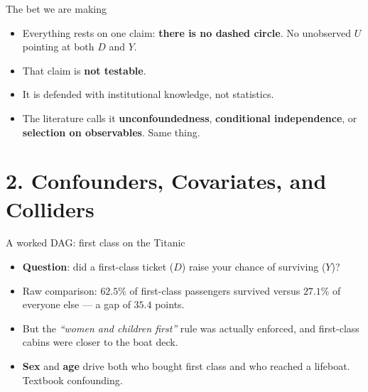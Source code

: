 \documentclass[
  11pt,
  ignorenonframetext,
  aspectratio=169,
]{beamer}
\providecommand{\tightlist}{%
  \setlength{\itemsep}{0pt}\setlength{\parskip}{0pt}}
\begin{document}
\begin{frame}{The bet we are making}
\protect{}\label{the-bet-we-are-making}
\begin{center}
\end{center}

\begin{itemize}
\tightlist
\item
  Everything rests on one claim: \textbf{there is no dashed circle}. No
  unobserved \(U\) pointing at both \(D\) and \(Y\).
\item
  That claim is \textbf{not testable}.
\item
  It is defended with institutional knowledge, not statistics.
\item
  The literature calls it \textbf{unconfoundedness}, \textbf{conditional
  independence}, or \textbf{selection on observables}. Same thing.
\end{itemize}
\end{frame}

\section{2. Confounders, Covariates, and
Colliders}\label{confounders-covariates-and-colliders}

\begin{frame}{A worked DAG: first class on the Titanic}
\protect{}\label{a-worked-dag-first-class-on-the-titanic}
\begin{itemize}
\tightlist
\item
  \textbf{Question}: did a first-class ticket (\(D\)) raise your chance
  of surviving (\(Y\))?
\item
  Raw comparison: \(62.5\%\) of first-class passengers survived versus
  \(27.1\%\) of everyone else --- a gap of \(35.4\) points.
\item
  But the \emph{``women and children first''} rule was actually
  enforced, and first-class cabins were closer to the boat deck.
\item
  \textbf{Sex} and \textbf{age} drive both who bought first class and
  who reached a lifeboat. Textbook confounding.
\end{itemize}
\end{frame}
\end{document}
